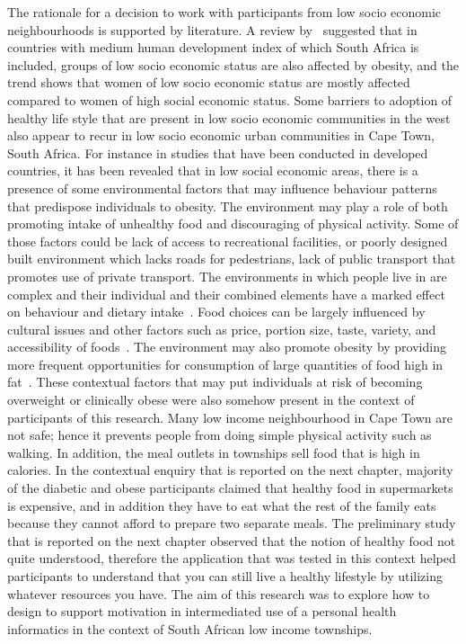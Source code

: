The rationale for a decision to work with participants from low socio economic neighbourhoods is supported by literature. A review by~\cite{dinsa2012obesity} suggested that in countries with medium human development index of which South Africa is included, groups of low socio economic status are also affected by obesity, and the trend shows that women of low socio economic status are mostly affected compared to women of high social economic status. Some barriers to adoption of healthy life style that are present in low socio economic communities in the west also appear to recur in low socio economic urban communities in Cape Town, South Africa. For instance in studies that have been conducted in developed countries, it has been revealed that in low social economic areas, there is a presence of some environmental factors that may influence behaviour patterns that predispose individuals to obesity. The environment may play a role of both promoting intake of unhealthy food and discouraging of physical activity. Some of those factors could be lack of access to recreational facilities, or poorly designed built environment which lacks roads for pedestrians, lack of public transport that promotes use of private transport. The environments in which people live in are complex and their individual and their combined elements have a marked effect on behaviour and dietary intake~\citep{swinburn2004diet}. Food choices can be largely influenced by cultural issues and other factors such as price, portion size, taste, variety, and accessibility of foods~\citep{ali2009factors}. The environment may also promote obesity by providing more frequent opportunities for consumption of large quantities of food high in fat~\citep{hill1998environmental}. These contextual factors that may put individuals at risk of becoming overweight or clinically obese were also somehow present in the context of participants of this research. Many low income neighbourhood in Cape Town are not safe; hence it prevents people from doing simple physical activity such as walking. In addition, the meal outlets in townships sell food that is high in calories. In the contextual enquiry that is reported on the next chapter, majority of the diabetic and obese participants claimed that healthy food in supermarkets is expensive, and in addition they have to eat what the rest of the family eats because they cannot afford to prepare two separate meals. The preliminary study that is reported on the next chapter observed that the notion of healthy food not quite understood, therefore the application that was tested in this context helped participants to understand that you can still live a healthy lifestyle by utilizing whatever resources you have. The aim of this research was to explore how to design to support motivation in intermediated use of a personal health informatics in the context of South African low income townships. 

